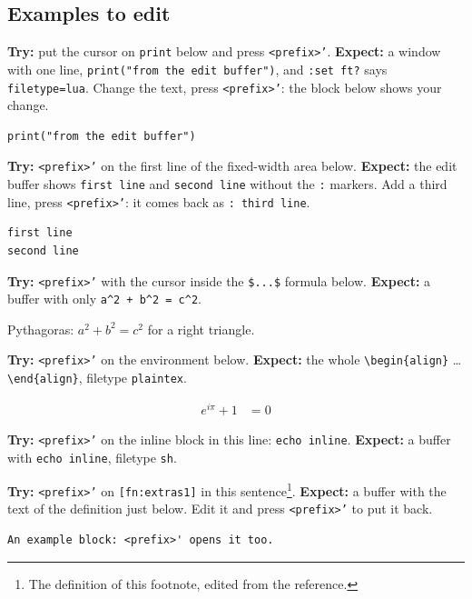 \subsection{Examples to edit}
\label{sec:orgbdd1cd6}
\textbf{Try:} put the cursor on \texttt{print} below and press \texttt{<prefix>'}.
\textbf{Expect:} a window with one line, \texttt{print("from the edit buffer")}, and
\texttt{:set ft?} says \texttt{filetype=lua}. Change the text, press \texttt{<prefix>'}: the
block below shows your change.

\begin{verbatim}
print("from the edit buffer")
\end{verbatim}

\textbf{Try:} \texttt{<prefix>'} on the first line of the fixed-width area below.
\textbf{Expect:} the edit buffer shows \texttt{first line} and \texttt{second line} without
the \texttt{:} markers. Add a third line, press \texttt{<prefix>'}: it comes back as
\texttt{: third line}.

\begin{verbatim}
first line
second line
\end{verbatim}

\textbf{Try:} \texttt{<prefix>'} with the cursor inside the \texttt{\$...\$} formula below.
\textbf{Expect:} a buffer with only \texttt{a\textasciicircum{}2 + b\textasciicircum{}2 = c\textasciicircum{}2}.

Pythagoras: \(a^2 + b^2 = c^2\) for a right triangle.

\textbf{Try:} \texttt{<prefix>'} on the environment below.
\textbf{Expect:} the whole \texttt{\textbackslash{}begin\{align\}} \ldots{} \texttt{\textbackslash{}end\{align\}}, filetype
\texttt{plaintex}.

\begin{align}
e^{i\pi} + 1 &= 0
\end{align}

\textbf{Try:} \texttt{<prefix>'} on the inline block in this line: \texttt{echo inline}.
\textbf{Expect:} a buffer with \texttt{echo inline}, filetype \texttt{sh}.

\textbf{Try:} \texttt{<prefix>'} on \texttt{[fn:extras1]} in this sentence\footnote{The definition of this footnote, edited from the reference.}.
\textbf{Expect:} a buffer with the text of the definition just below. Edit it
and press \texttt{<prefix>'} to put it back.

\begin{verbatim}
An example block: <prefix>' opens it too.
\end{verbatim}
